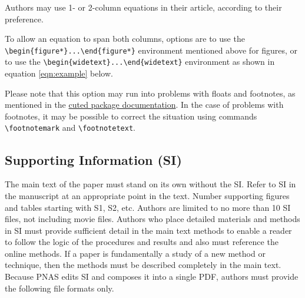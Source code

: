 \documentclass[9pt,twocolumn,twoside]{pnas-new}
\begin{document}
Authors may use 1- or 2-column equations in their article, according to their preference.

To allow an equation to span both columns, options are to use the \verb|\begin{figure*}...\end{figure*}| environment mentioned above for figures, or to use the \verb|\begin{widetext}...\end{widetext}| environment as shown in equation \ref{eqn:example} below.

Please note that this option may run into problems with floats and footnotes, as mentioned in the \href{http://texdoc.net/pkg/cuted}{cuted package documentation}. In the case of problems with footnotes, it may be possible to correct the situation using commands \verb|\footnotemark| and \verb|\footnotetext|.



\subsection*{Supporting Information (SI)}

The main text of the paper must stand on its own without the SI. Refer to SI in the manuscript at an appropriate point in the text. Number supporting figures and tables starting with S1, S2, etc. Authors are limited to no more than 10 SI files, not including movie files. Authors who place detailed materials and methods in SI must provide sufficient detail in the main text methods to enable a reader to follow the logic of the procedures and results and also must reference the online methods. If a paper is fundamentally a study of a new method or technique, then the methods must be described completely in the main text. Because PNAS edits SI and composes it into a single PDF, authors must provide the following file formats only.
\end{document}
